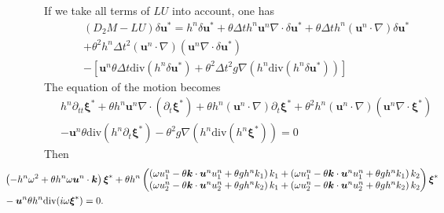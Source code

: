 \documentclass[a4paper, 11pt]{article}
\begin{document}
If we take all terms of $LU$ into account, one has
\begin{equation*}
\begin{split}
&(D_2 M-LU) \delta \boldsymbol{u}^*=h^n \delta \boldsymbol{u}^*+\theta\Delta th^n\boldsymbol{u}^n\nabla \cdot \delta \boldsymbol{u}^*+\theta\Delta th^n\left(\boldsymbol{u}^n\cdot \nabla \right)\delta \boldsymbol{u}^*\\
&+\theta^2h^n\Delta t^2\left(\boldsymbol{u}^n\cdot \nabla\right)\left(\boldsymbol{u}^n\nabla \cdot \delta \boldsymbol{u}^*\right)\\
&-\left[\boldsymbol{u}^n\theta\Delta t\text{div}(h^n\delta \boldsymbol{u}^*)+\theta^2\Delta t^2g\nabla \left(h^n\text{div}(h^n\delta \boldsymbol{u}^*)\right)\right]
\end{split}
\end{equation*}
The equation of the motion becomes 
\begin{equation*}
\begin{split}
&h^n\partial_{tt}\boldsymbol{\xi}^*+\theta h^n\boldsymbol{u}^n\nabla \cdot \left(\partial_t \boldsymbol{\xi}^*\right)+\theta h^n\left(\boldsymbol{u}^n\cdot \nabla\right)\partial_t \boldsymbol{\xi}^*+\theta^2h^n\left(\boldsymbol{u}^n\cdot \nabla\right)\left(\boldsymbol{u}^n\nabla \cdot \boldsymbol{\xi}^*\right)\\
&-\boldsymbol{u}^n\theta\text{div}(h^n\partial_t\boldsymbol{\xi}^*)-\theta^2g\nabla \left(h^n\text{div}(h^n\boldsymbol{\xi}^*)\right)=0
\end{split}
\end{equation*}
Then
\begin{equation*}
\begin{split}
&\hspace*{-1.5cm}\left(-h^n\omega^2+\theta h^n\omega \boldsymbol{u}^n\cdot \boldsymbol{k}\right)\boldsymbol{\xi}^*+\theta h^n \begin{pmatrix}\left(\omega u_1^n-\theta\boldsymbol{k}\cdot \boldsymbol{u}^n u_1^n+\theta g h^nk_1\right)k_1+\left(\omega u_1^n-\theta\boldsymbol{k}\cdot \boldsymbol{u}^n u_1^n+\theta g h^nk_1\right)k_2 \\
\left(\omega u_2^n-\theta\boldsymbol{k}\cdot \boldsymbol{u}^n u_2^n+\theta g h^nk_2\right)k_1+\left(\omega u_2^n-\theta\boldsymbol{k}\cdot \boldsymbol{u}^n u_2^n+\theta g h^nk_2\right)k_2\end{pmatrix}\boldsymbol{\xi}^*\\
&\hspace*{-1.5cm}-\boldsymbol{u}^n\theta h^n \text{div}(i\omega \boldsymbol{\xi}^*)=0.
\end{split}
\end{equation*}
\end{document}
